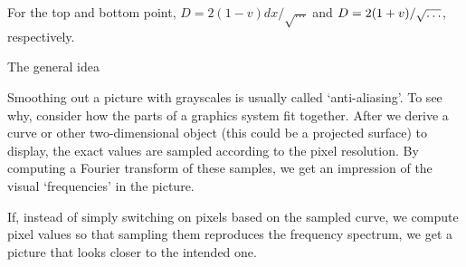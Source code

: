 For the top and bottom point, $D=2(1-v)dx/\sqrt{\ldots}$ and
$D=\nobreak 2(1+v)/\sqrt{\ldots}$, respectively.

 {The general idea}

Smoothing out a picture with grayscales is usually called
`anti-aliasing'. To see why, consider how the
parts of a graphics system fit together. After we derive a curve
or other two-dimensional object (this could be a projected surface) to
display, the exact values are sampled according to the pixel
resolution. By computing a Fourier transform of these samples, we get
an impression of the visual `frequencies' in the picture.

If, instead of simply switching on pixels based on the sampled curve, we
compute pixel values so that sampling them reproduces the frequency
spectrum, we get a picture that looks closer to the intended one.

\endinput
\Level 0 {Raster graphics in \Metafont}

The basic problem of raster graphics is to take a curve
\[ \bar z=\bar z(t),\quad t=0\ldots n \]
and render it by turning on certain pixels on a raster graphics
device, be this a screen or a printer.

The simplest solution to this problem is to round the points along to
the path to the closest pixel: the point $(1.1,2.7)$ is rounded
to~$(1,3)$\footnote{We will use pixel-based coordinates throughout
  this chapter.}. We will never discretize a single (curved) line;
rather we are interested in rendering an outlined area between two
curves. The rounding algorithm is then equivalent to saying that a
pixel belongs to the digitized region if its center lies in the
original, undiscretized, region.

\begin{comment}
\begin{594exercise}
The second formulation of the pixel choosing algorithm is more
constructive. Argue this. How do you test whether a pixel lies in
between two curves?
\end{594exercise}
\begin{answer}
The first formulation requires the algorithm to follow the curve. This
involves an infinite number of points, so one would have to solve the
problem of taking a finite subset of those, and not skip any points.
In the second formulation, only a finite number of pixels has to be
investigated.\par
A~curve is defined as the points for which some function
satisfies~$F(t)=\nobreak0$. The points in between two curves then
satisfy $F_1(t)\geq0$, $F_2(t)<0$.
\end{answer}
\end{comment}

